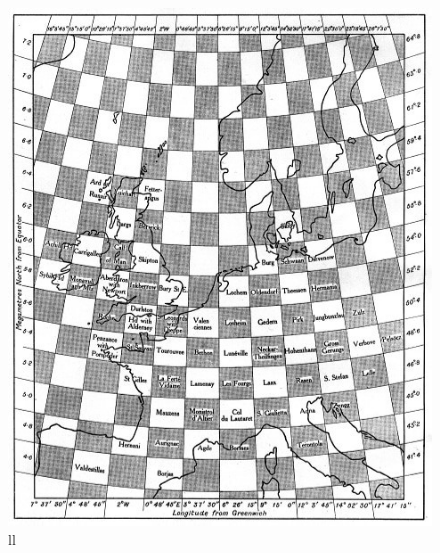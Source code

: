 \begin{figure}
	\centering
	\includegraphics{eingeteilte_Karte.jpg}
	\caption{ll}
	\label{bild:karteEuropa}
\end{figure}



